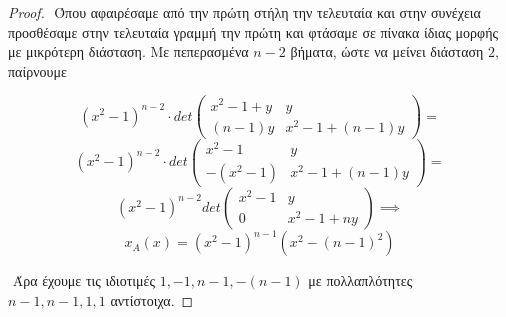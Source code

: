 \documentclass[oneside,a4paper]{article}
\begin{document}
\begin{proof}
	$ $\newline 
	Όπου αφαιρέσαμε από την πρώτη στήλη την τελευταία και στην συνέχεια προσθέσαμε στην τελευταία γραμμή την πρώτη και φτάσαμε σε πίνακα ίδιας μορφής με μικρότερη διάσταση. Με πεπερασμένα $n-2$ βήματα, ώστε να μείνει διάσταση $2$, παίρνουμε

	$$ (x^2-1)^{n-2} \cdot det \begin{pmatrix}
		x^2 -1 +y & y \\
		(n-1)y & x^2 - 1 + (n-1)y
	\end{pmatrix} = $$
	$$ (x^2-1)^{n-2} \cdot det \begin{pmatrix}
		x^2 -1  & y \\
		-(x^2 -1) & x^2 - 1 + (n-1)y
	\end{pmatrix} = $$
	$$ (x^2-1)^{n-2} det \begin{pmatrix}
		x^2 -1 & y \\
		0 & x^2 - 1 + ny
	\end{pmatrix} \implies $$
	\vspace*{1cm}
	$$ x_A (x) = (x^2 -1)^{n-1}(x^2-(n-1)^2)$$

	$ $\newline
	Άρα έχουμε τις ιδιοτιμές $1,-1,n-1, -(n-1)$ με πολλαπλότητες $n-1,n-1,1,1$ αντίστοιχα.
\end{proof}
\end{document}
